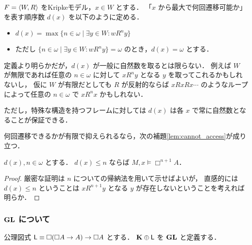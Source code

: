 \documentclass{jlreq}
\begin{document}
\begin{definition}
	$F = \langle W, R \rangle$ をKripkeモデル，$x \in W$ とする．
	「$x$ から最大で何回遷移可能か」を表す順序数 $d(x)$ を以下のように定める．
	\begin{itemize}
		\item $d(x) = \max \{ n \in \omega \mid \exists y \in W \colon w R^n y \}$
		\item ただし $\{ n \in \omega \mid \exists y \in W \colon w R^n y \} = \omega$ のとき，$d(x) = \omega$ とする．
	\end{itemize}
\end{definition}

\begin{remark}
	定義より明らかだが，$d(x)$ が一般に自然数を取るとは限らない．
	例えば $W$ が無限であれば任意の $n \in \omega$ に対して $x R^n y$ となる $y$ を取ってこれるかもしれないし，
	仮に $W$ が有限だとしても $R$ が反射的ならば $x R x R x \cdots$ のようなループによって任意の $n \in \omega$ で $x R^n x$ かもしれない．

	ただし，特殊な構造を持つフレームに対しては $d(x)$ は各 $x$ で常に自然数となることが保証できる．
\end{remark}

何回遷移できるかが有限で抑えられるなら，次の補題\ref{lem:cannot_access}が成り立つ．

\begin{lemma}\label{lem:cannot_access}
	$d(x), n \in \omega$ とする．
	$d(x) \leq n$ ならば $M,x \vDash \Box^{n + 1} A$．
\end{lemma}

\begin{proof}
	厳密な証明は $n$ についての帰納法を用いて示せばよいが，
	直感的には $d(x) \leq n$ ということは $x R^{n + 1} y$ となる $y$ が存在しないということを考えれば明らか．

\end{proof}

\subsubsection{$\LogicGL$ について}

\begin{definition}
	公理図式 $\mathsf{L} \equiv \Box(\Box A \to A) \to \Box A$ とする．\index{$\AxL$}
	$\mathbf{K} \oplus \mathsf{L}$ を $\LogicGL$ と定義する．\index{$\LogicGL$}
\end{definition}
\end{document}
